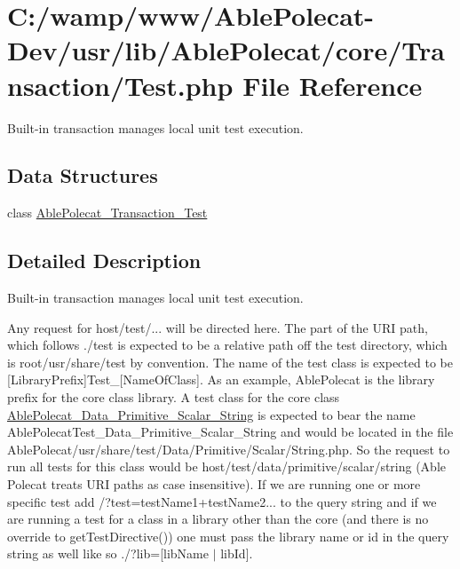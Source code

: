\hypertarget{_transaction_2_test_8php}{}\section{C\+:/wamp/www/\+Able\+Polecat-\/\+Dev/usr/lib/\+Able\+Polecat/core/\+Transaction/\+Test.php File Reference}
\label{_transaction_2_test_8php}


Built-\/in transaction manages local unit test execution.  


\subsection*{Data Structures}
\begin{DoxyCompactItemize}
\item 
class \hyperlink{class_able_polecat___transaction___test}{Able\+Polecat\+\_\+\+Transaction\+\_\+\+Test}
\end{DoxyCompactItemize}


\subsection{Detailed Description}
Built-\/in transaction manages local unit test execution. 

Any request for host/test/... will be directed here. The part of the U\+R\+I path, which follows ./test is expected to be a relative path off the test directory, which is root/usr/share/test by convention. The name of the test class is expected to be \mbox{[}Library\+Prefix\mbox{]}Test\+\_\+\mbox{[}Name\+Of\+Class\mbox{]}. As an example, Able\+Polecat is the library prefix for the core class library. A test class for the core class \hyperlink{class_able_polecat___data___primitive___scalar___string}{Able\+Polecat\+\_\+\+Data\+\_\+\+Primitive\+\_\+\+Scalar\+\_\+\+String} is expected to bear the name Able\+Polecat\+Test\+\_\+\+Data\+\_\+\+Primitive\+\_\+\+Scalar\+\_\+\+String and would be located in the file Able\+Polecat/usr/share/test/\+Data/\+Primitive/\+Scalar/\+String.\+php. So the request to run all tests for this class would be host/test/data/primitive/scalar/string (Able Polecat treats U\+R\+I paths as case insensitive). If we are running one or more specific test add /?test=test\+Name1+test\+Name2... to the query string and if we are running a test for a class in a library other than the core (and there is no override to get\+Test\+Directive()) one must pass the library name or id in the query string as well like so ./?lib=\mbox{[}lib\+Name $\vert$ lib\+Id\mbox{]}.

